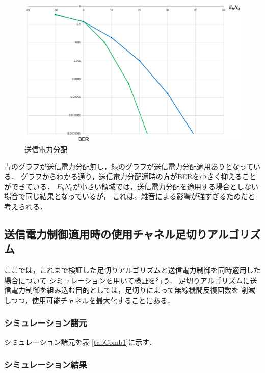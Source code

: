 \begin{figure}[ht]
    \centering
    \includegraphics[width=0.95\linewidth]{chapter4/figure/PconSim1.eps}
    \caption{送信電力分配}
    \label{figPconSim1}
\end{figure}

青のグラフが送信電力分配無し，緑のグラフが送信電力分配適用ありとなっている．
グラフからわかる通り，送信電力分配適時の方がBERを小さく抑えることができている．
$E_bN_0$が小さい領域では，送信電力分配を適用する場合としない場合で同じ結果となっているが，
これは，雑音による影響が強すぎるためだと考えられる．

\subsection{送信電力制御適用時の使用チャネル足切りアルゴリズム}
ここでは，これまで検証した足切りアルゴリズムと送信電力制御を同時適用した場合について
シミュレーションを用いて検証を行う．
足切りアルゴリズムに送信電力制御を組み込む目的としては，足切りによって無線機間反復回数を
削減しつつ，使用可能チャネルを最大化することにある．

\subsubsection{シミュレーション諸元}
シミュレーション諸元を表 \ref{tabComb1}に示す．

\subsubsection{シミュレーション結果}
